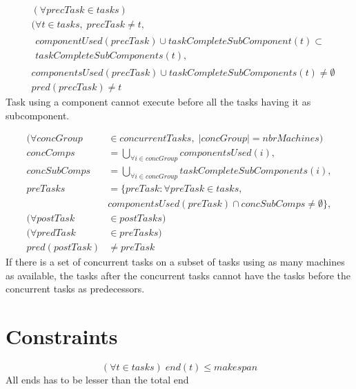  \begin{equation}
 \begin{aligned}\label{eq:90}
 &(\forall precTask \in tasks) \\
 &(\forall t \in tasks, \; precTask \neq t,\\
 &\begin{aligned}componentUsed(precTask) \cup taskCompleteSubComponent(t) \subset\\
 taskCompleteSubComponents(t), \end{aligned}\\
 &componentsUsed(precTask) \cup taskCompleteSubComponents(t) \neq \emptyset \\
 &pred(precTask) \neq t
 \end{aligned}
 \end{equation}
 Task using a component cannot execute before all the tasks having it as subcomponent.
 
 \begin{equation}
 \begin{aligned}\label{eq:91}
 (\forall concGroup &\in concurrentTasks, \; |concGroup| = nbrMachines) \\
 concComps &= \bigcup_{\forall i \in concGroup}componentsUsed(i), \\
 concSubComps &= \bigcup_{\forall i \in concGroup}taskCompleteSubComponents(i), \\
 preTasks &= \{preTask : \forall preTask \in tasks,\\
 &componentsUsed(preTask) \cap concSubComps \neq \emptyset\}, \\
 (\forall postTask &\in postTasks) \\
 (\forall predTask &\in preTasks) \\
 pred(postTask) &\neq preTask
 \end{aligned}
 \end{equation}
 If there is a set of concurrent tasks on a subset of tasks using as many machines as available, the tasks after the concurrent tasks cannot have the tasks before the concurrent tasks as predecessors.
 
 
 \section{Constraints}
 
 \begin{equation}\label{eq:92}
 (\forall t \in tasks) \; end(t) \le makespan
 \end{equation}
 All ends has to be lesser than the total end
 
